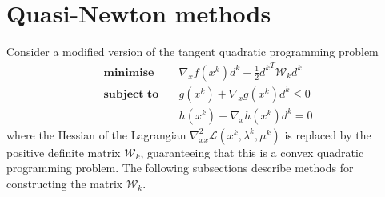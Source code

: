 \documentclass[a4paper,twoside,10pt,english]{report}
\begin{document}
\section{Quasi-Newton methods}
Consider a modified version of the tangent quadratic programming problem
\begin{align*}
\textbf{minimise} \quad &  \nabla_{x}f\left(x^{k}\right)d^{k} +
\frac{1}{2}{d^{k}}^T\mathcal{W}_{k} d^{k} \\
\textbf{subject to} \quad & g\left(x^{k}\right)+\nabla_{x}g\left(x^{k}\right)d^{k}\le0\\
 & h\left(x^{k}\right)+\nabla_{x}h\left(x^{k}\right)d^{k}=0
\end{align*}
where the Hessian of the Lagrangian 
$\nabla_{xx}^{2}\mathcal{L}\left(x^{k},\lambda^{k},\mu^{k}\right)$
is replaced by the positive definite matrix $\mathcal{W}_{k}$, guaranteeing
that this is a convex quadratic programming problem. The following
subsections describe methods for constructing the matrix $\mathcal{W}_{k}$.

\end{document}
